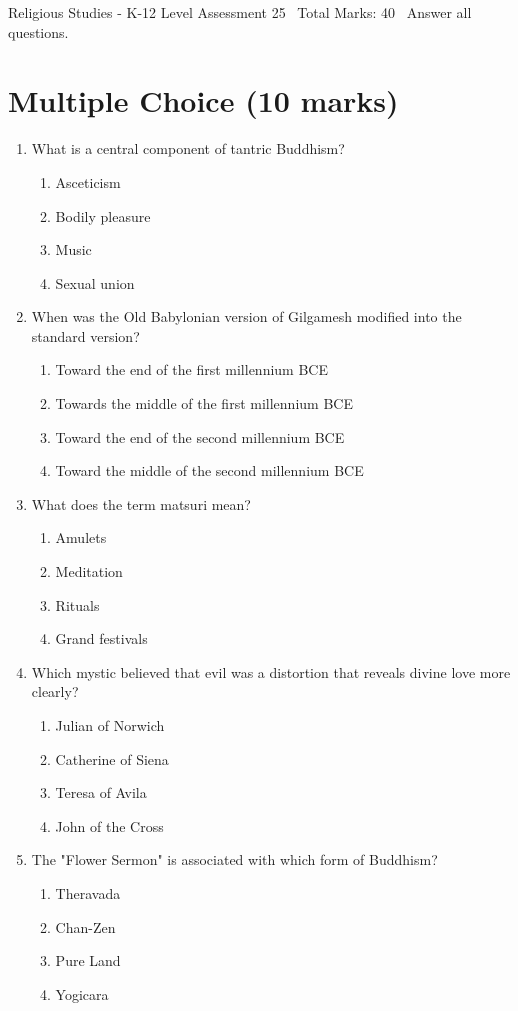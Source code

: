 \documentclass[12pt]{article}
\begin{document}
\begin{center}
Religious Studies - K-12 Level Assessment 25 \
Total Marks: 40 \
Answer all questions.
\end{center}

\section*{Multiple Choice (10 marks)}
\begin{enumerate}[label=\arabic*.]
\item What is a central component of tantric Buddhism?
\begin{enumerate}[label=(\alph*)]
    \item Asceticism
    \item Bodily pleasure
    \item Music
    \item Sexual union
\end{enumerate}
\item When was the Old Babylonian version of Gilgamesh modified into the standard version?
\begin{enumerate}[label=(\alph*)]
    \item Toward the end of the first millennium BCE
    \item Towards the middle of the first millennium BCE
    \item Toward the end of the second millennium BCE
    \item Toward the middle of the second millennium BCE
\end{enumerate}
\item What does the term matsuri mean?
\begin{enumerate}[label=(\alph*)]
    \item Amulets
    \item Meditation
    \item Rituals
    \item Grand festivals
\end{enumerate}
\item Which mystic believed that evil was a distortion that reveals divine love more clearly?
\begin{enumerate}[label=(\alph*)]
    \item Julian of Norwich
    \item Catherine of Siena
    \item Teresa of Avila
    \item John of the Cross
\end{enumerate}
\item The "Flower Sermon" is associated with which form of Buddhism?
\begin{enumerate}[label=(\alph*)]
    \item Theravada
    \item Chan-Zen
    \item Pure Land
    \item Yogicara
\end{enumerate}
\end{enumerate}
\end{document}
